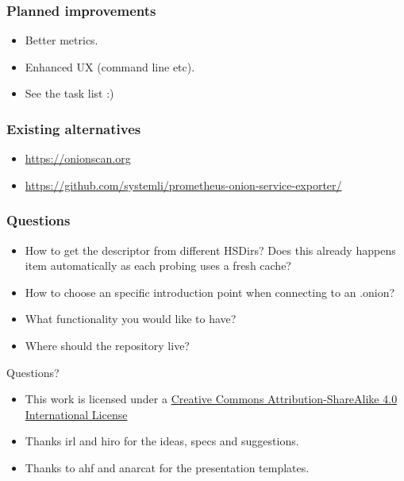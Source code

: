 \documentclass[aspectratio=169,12pt]{beamer}
\begin{document}
\begin{frame}
  \frametitle{Planned improvements}

  \begin{itemize}
    \item Better metrics.
    \item Enhanced UX (command line etc).
    \item See the task list :)
  \end{itemize}
\end{frame}

\begin{frame}
  \frametitle{Existing alternatives}

  \begin{itemize}
    \item \href{https://onionscan.org}{https://onionscan.org}
    \item \href{https://github.com/systemli/prometheus-onion-service-exporter/}{https://github.com/systemli/prometheus-onion-service-exporter/}
  \end{itemize}
\end{frame}

\begin{frame}
  \frametitle{Questions}

  \begin{itemize}
    \item How to get the descriptor from different HSDirs? Does this already happens
          item automatically as each probing uses a fresh cache?

    \item How to choose an specific introduction point when connecting to an .onion?

    \item What functionality you would like to have?

    \item Where should the repository live?
  \end{itemize}
\end{frame}

\begin{frame}{}
    \centering

    \vfill
    \huge Questions?
    \vfill

    \normalsize

    \begin{itemize}
      \item This work is licensed under a
            \href{https://creativecommons.org/licenses/by-sa/4.0/}{Creative Commons Attribution-ShareAlike 4.0 International License}

      \item Thanks irl and hiro for the ideas, specs and suggestions.

      \item Thanks to ahf and anarcat for the presentation templates.
    \end{itemize}

    \centering
    \vfill
    \ccbysa
    \vfill

\end{frame}
\end{document}
